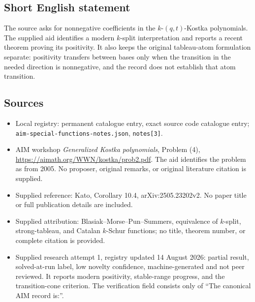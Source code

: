 \documentclass[11pt]{article}
\begin{document}
\subsection{Short English statement}
The source asks for nonnegative coefficients in the $k$-$(q,t)$-Kostka polynomials. The supplied aid identifies a modern $k$-split interpretation and reports a recent theorem proving its positivity. It also keeps the original tableau-atom formulation separate: positivity transfers between bases only when the transition in the needed direction is nonnegative, and the record does not establish that atom transition.
\subsection{Sources}
\begin{itemize}
\item Local registry: permanent catalogue entry, exact source code catalogue entry; \texttt{aim-special-functions-notes.json}, \texttt{notes[3]}.
\item AIM workshop \emph{Generalized Kostka polynomials}, Problem (4), \url{https://aimath.org/WWN/kostka/prob2.pdf}. The aid identifies the problem as from 2005. No proposer, original remarks, or original literature citation is supplied.
\item Supplied reference: Kato, Corollary 10.4, arXiv:2505.23202v2. No paper title or full publication details are included.
\item Supplied attribution: Blasiak--Morse--Pun--Summers, equivalence of $k$-split, strong-tableau, and Catalan $k$-Schur functions; no title, theorem number, or complete citation is provided.
\item Supplied research attempt 1, registry updated 14 August 2026: partial result, solved-at-run label, low novelty confidence, machine-generated and not peer reviewed. It reports modern positivity, stable-range progress, and the transition-cone criterion. The verification field consists only of ``The canonical AIM record is:''.
\end{itemize}
\end{document}
